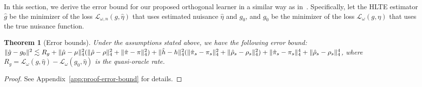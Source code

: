 \documentclass{article}
\theoremstyle{plain}
\newtheorem{theorem}{Theorem}[section]
\theoremstyle{definition}
\newtheorem{assumption}[theorem]{Assumption}
\theoremstyle{remark}
\newcommand{\1}{\mathds{1}}                %
\begin{document}
In this section, we derive the error bound for our proposed orthogonal learner in a similar way as in~\cite{Morzywolek.2023}. Specifically, let the HLTE estimator $\hat{g}$ be the minimizer of the loss $\mathcal{L}_{\omega,n}(g, \hat\eta)$ that uses estimated nuisance $\hat\eta$ and $g_0$, and $g_0$ be the minimizer of the loss $\mathcal{L}_\omega(g, \eta)$ that uses the true nuisance function. %
\begin{theorem}[Error bounds]
    Under the assumptions stated above, we have the following error bound:
$    \|\hat{g}-g_0\|^2 \lesssim R_g + \|\hat\mu-\mu\|_4^2(\|\hat\rho-\rho\|_4^2 + \|\hat\pi-\pi\|_4^2) \notag %
    + \|\hat{h}-h\|_4^2( \|\hat\pi_s-\pi_s\|_4^2 + \|\hat\rho_s-\rho_s\|_4^2) + \|\hat\pi_s-\pi_s\|_4^4 + \|\hat\rho_s-\rho_s\|_4^4$,
    where $R_g=\mathcal{L}_\omega(\hat{g}, \hat{\eta}) - \mathcal{L}_\omega(g_0, \hat{\eta})$ is the quasi-oracle rate.
\end{theorem}
\vspace{-0.5cm}
\begin{proof}
    See Appendix~\ref{app:proof-error-bound} for details.
\end{proof}
\end{document}
